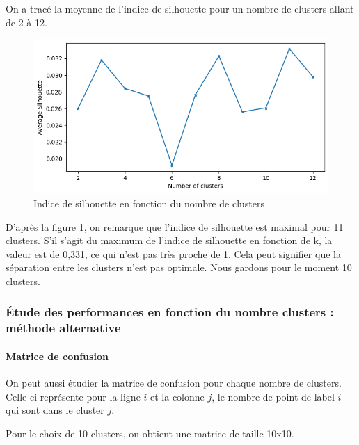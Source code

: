 \documentclass[french,a4paper,18pt]{article}
\begin{document}
On a tracé la moyenne de l'indice de silhouette pour un nombre de clusters allant de 2 à 12.

\begin{figure}[h!]
    \centering
    \includegraphics[scale=0.4]{images/mnist_kmedoids_silhouette.png}
    \caption{Indice de silhouette en fonction du nombre de clusters}\label{fig:mnist_kmedoids_silhouette}
\end{figure}

D'après la figure \ref{fig:mnist_kmedoids_silhouette}, on remarque que l'indice de silhouette est maximal pour 11 clusters.
S'il s'agit du maximum de l'indice de silhouette en fonction de k, la valeur est de 0,331, ce qui n'est pas très proche de 1.
Cela peut signifier que la séparation entre les clusters n'est pas optimale.
Nous gardons pour le moment 10 clusters.

\subsubsection{Étude des performances en fonction du nombre clusters : méthode alternative}

\paragraph{Matrice de confusion}
On peut aussi étudier la matrice de confusion pour chaque nombre de clusters.
Celle ci représente pour la ligne $i$ et la colonne $j$, le nombre de point de label $i$ qui sont dans le cluster $j$.

Pour le choix de 10 clusters, on obtient une matrice de taille 10x10.
\end{document}
